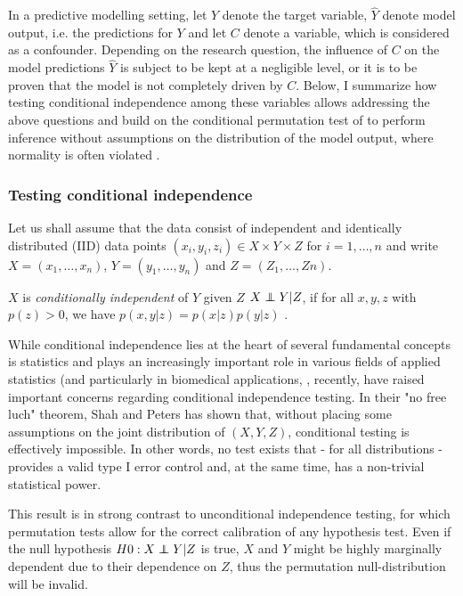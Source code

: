 \documentclass{article}
\theoremstyle{definition}
\newcommand\independent{\protect\mathpalette{\protect\independenT}{\perp}}
\def\independenT#1#2{\mathrel{\rlap{$#1#2$}\mkern2mu{#1#2}}}
\begin{document}
In a predictive modelling setting, let $Y$ denote the target variable, $\hat{Y}$ denote model output, i.e. the predictions for $Y$ and let $C$ denote a variable, which is considered as a confounder. Depending on the research question, the influence of $C$ on the model predictions $\hat{Y}$ is subject to be kept at a negligible level, or it is to be proven that the model is not completely driven by $C$. Below, I summarize how testing conditional independence \citep{dawid1979conditional} among these variables allows addressing the above questions and build on the conditional permutation test of \cite{berrett2020conditional} to perform inference without assumptions on the distribution of the model output, where normality is often violated \citep{garcia2009study, kristensen2017whole}.

\subsubsection*{Testing conditional independence}

Let us shall assume that the data consist of independent and identically distributed (IID) data points $(x_i, y_i, z_i) \in X \times Y \times Z$ for $i=1, \dots , n$ and write $X=(x_1, \dots ,x_n)$, $Y=(y_1, \dots, y_n)$ and $Z=(Z_1, \dots, Zn)$. 

$X$ is \emph{conditionally independent} of $Y$ given $Z$ $X \independent Y | Z$, if for all $x, y, z$ with $p(z) > 0$, we have $p(x, y|z) = p(x|z)p(y|z)$ \citep{dawid1979conditional}.

While conditional independence lies at the heart of several fundamental concepts is statistics and  plays an increasingly important role in various fields of applied statistics (and particularly in biomedical applications, \citep{spirtes2000causation, peters2016causal, fiedler2011mediation, candes2016panning}, recently, \cite{shah2020hardness} have raised important concerns regarding conditional independence testing.
In their "no free luch" theorem, Shah and Peters has shown that, without placing some assumptions on the joint distribution of $(X, Y, Z)$, conditional testing is effectively impossible. In other words, no test exists that - for all distributions - provides a valid type I error control and, at the same time, has a non-trivial statistical power.

This result is in strong contrast to unconditional independence testing, for which permutation tests  \citep{pitman1937significance, fisher1942189} allow for the correct calibration of any hypothesis test. Even if the null hypothesis $H0 :X \independent Y|Z$ is true, $X$ and $Y$ might be highly marginally dependent due to their dependence on $Z$,  thus the permutation null-distribution will be invalid.
\end{document}
